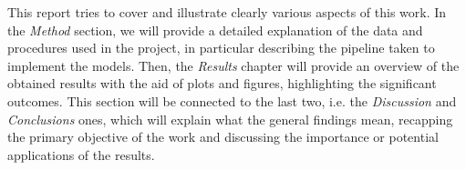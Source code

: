 This report tries to cover and illustrate clearly various aspects of this work. 
In the \textit{Method} section, we will provide a detailed explanation of
the data and procedures used in the project, in particular describing the pipeline
taken to implement the models.
Then, the \textit{Results} chapter will provide an overview of the obtained results
with the aid of plots and figures, highlighting the significant outcomes.
This section will be connected to the last two, i.e. the \textit{Discussion} and
\textit{Conclusions} ones, which will explain what the general findings mean,
recapping the primary objective of the work and discussing the importance or
potential applications of the results.


